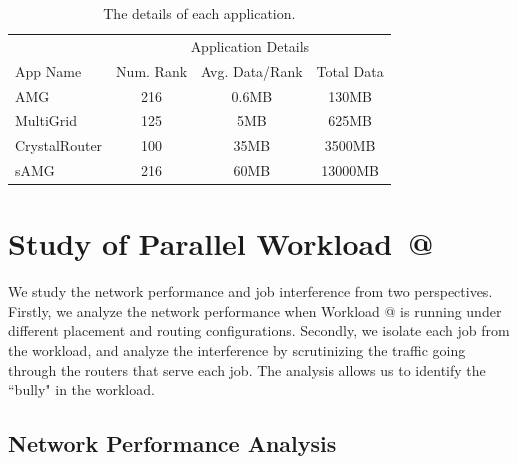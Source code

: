 \documentclass[conference,compsoc]{IEEEtran}
\makeatletter
\newcommand{\Rmnum}[1]{\expandafter\@slowromancap\romannumeral #1@}
\makeatother
\begin{document}
\begin{table}[ht]
\begin{center}
\caption{The details of each application.} 
\label{tab:apps-detail}
\begin{tabular}{l c c c }
\toprule %
\toprule
&\multicolumn{3}{c}{Application Details} \\ 
\cmidrule(l){2-4}
App Name & Num. Rank & Avg. Data/Rank & Total Data\\ %
\midrule %
AMG  &    216 &   0.6MB   &     130MB\\ %
\midrule
MultiGrid  &    125 &   5MB   &     625MB\\ 
\midrule
CrystalRouter  &   100  &  35MB    &     3500MB\\ 
\midrule
sAMG  &    216 &   60MB   &     13000MB\\ %
\midrule %
\bottomrule %
\end{tabular}
\end{center}
\end{table}



\section{Study of Parallel Workload~\Rmnum{1}}
\label{sec:workload-1}

We study the network performance and job interference from two perspectives. Firstly, we analyze the network performance when Workload \Rmnum{1} is running under different placement and routing configurations. Secondly, we isolate each job from the workload, and analyze the interference by scrutinizing the traffic going through the routers that serve each job. The analysis allows us to identify the ``bully" in the workload. 


\subsection{Network Performance Analysis}
\label{sec: workload-1 network analysis}
\end{document}
